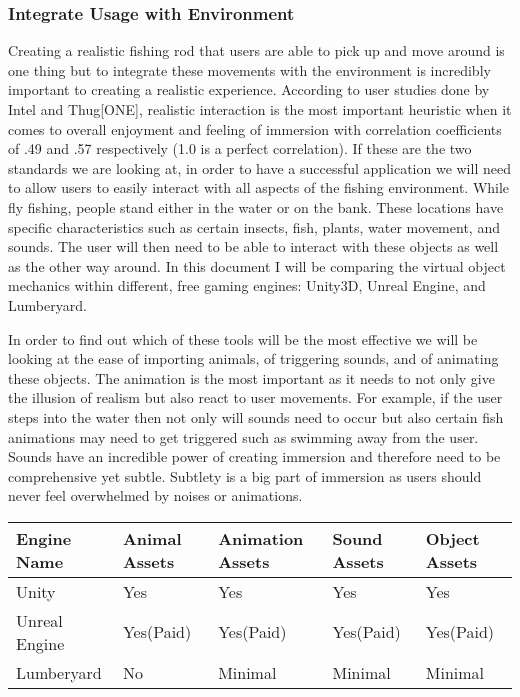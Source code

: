 \documentclass[10pt,journal,compsoc,onecolumn, draftclsnofoot]{IEEEtran}
\begin{document}
\subsubsection{Integrate Usage with Environment}
Creating a realistic fishing rod that users are able to pick up and move around is one thing but to integrate these movements with the environment is incredibly important to creating a realistic experience. According to user studies done by Intel and Thug[ONE], realistic interaction is the most important heuristic when it comes to overall enjoyment and feeling of immersion with correlation coefficients of .49 and .57 respectively (1.0 is a perfect correlation). If these are the two standards we are looking at, in order to have a successful application we will need to allow users to easily interact with all aspects of the fishing environment. While fly fishing, people stand either in the water or on the bank. These locations have specific characteristics such as certain insects, fish, plants, water movement, and sounds. The user will then need to be able to interact with these objects as well as the other way around. In this document I will be comparing the virtual object mechanics within different, free gaming engines: Unity3D, Unreal Engine, and Lumberyard.

In order to find out which of these tools will be the most effective we will be looking at the ease of importing animals, of triggering sounds, and of animating these objects. The animation is the most important as it needs to not only give the illusion of realism but also react to user movements. For example, if the user steps into the water then not only will sounds need to occur but also certain fish animations may need to get triggered such as swimming away from the user. Sounds have an incredible power of creating immersion and therefore need to be comprehensive yet subtle. Subtlety is a big part of immersion as users should never feel overwhelmed by noises or animations.

\vspace{2mm}
\begin{table}[h!]
\centering
  \begin{tabu} to 1.0\textwidth { | X[l] || X[c] | X[c] | X[c] | X[c] |  }
  \hline
  Engine Name & Animal Assets & Animation Assets & Sound Assets & Object Assets\\
  \hline
  Unity  & Yes & Yes & Yes & Yes\\
  Unreal Engine &   Yes(Paid) & Yes(Paid) & Yes(Paid) & Yes(Paid)\\
  Lumberyard & No & Minimal & Minimal & Minimal \\
  \hline
  \end{tabu}
\end{table}
\vspace{2mm}
\end{document}
